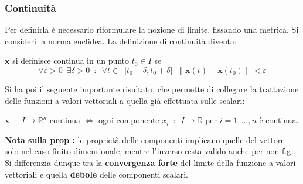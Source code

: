 \documentclass[10pt]{article}
\theoremstyle{plain}
\begin{document}
\subsubsection{Continuità}
Per definirla è necessario riformulare la nozione di limite, fissando una metrica. Si consideri la norma euclidea. La definizione di continuità diventa:
\begin{defin}
$\mathbf{x}$ si definisce continua in un punto $t_0 \in I$ se 
\[\forall \varepsilon > 0 \enspace \exists \delta > 0 \enspace : \enspace \forall t \in \enspace ]t_0 - \delta, t_0 + \delta[ \enspace \|\mathbf{x}(t) - \mathbf{x}(t_0)\| < \varepsilon\]
\end{defin}
Si ha poi il seguente importante risultato, che permette di collegare la trattazione delle funzioni a valori vettoriali a quella già effettuata sulle scalari:
\begin{prop}
$\displaystyle \mathbf{x} \enspace : \enspace I \rightarrow \mathbb{R}^n$ continua $\Leftrightarrow$ ogni componente $x_i \enspace : \enspace I \rightarrow \mathbb{R}$ per $i = 1, ..., n$ è continua.
\end{prop}
\textbf{Nota sulla prop :} le proprietà delle componenti implicano quelle del vettore solo nel caso finito dimensionale, mentre l'inverso resta valido anche per non f.g.. Si differenzia dunque tra la \textbf{convergenza forte} del limite della funzione a valori vettoriali e quella \textbf{debole} delle componenti scalari.
\end{document}
